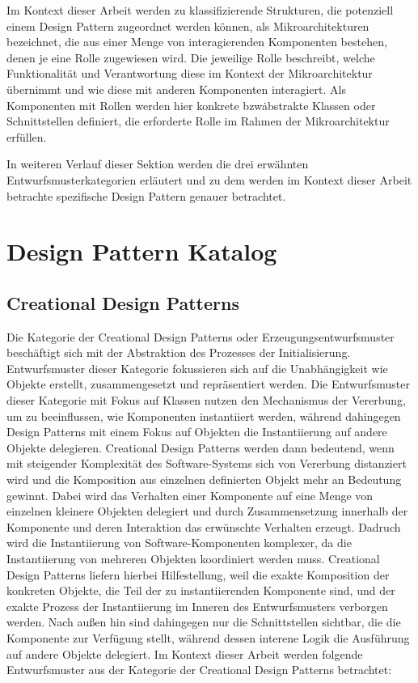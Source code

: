 Im Kontext dieser Arbeit werden zu klassifizierende Strukturen, die potenziell einem Design Pattern zugeordnet werden können, als Mikroarchitekturen bezeichnet, die aus einer Menge von interagierenden Komponenten bestehen, denen je eine Rolle zugewiesen wird. Die jeweilige Rolle beschreibt, welche Funktionalität und Verantwortung diese im Kontext der Mikroarchitektur übernimmt und wie diese mit anderen Komponenten interagiert.
Als Komponenten mit Rollen werden hier konkrete bzw\. abstrakte Klassen oder Schnittstellen definiert, die erforderte Rolle im Rahmen der Mikroarchitektur erfüllen.

In weiteren Verlauf dieser Sektion werden die drei erwähnten Entwurfsmusterkategorien erläutert und zu dem werden im Kontext dieser Arbeit betrachte spezifische Design Pattern genauer betrachtet.

\newpage

\section{Design Pattern Katalog}

\subsection{Creational Design Patterns}

Die Kategorie der Creational Design Patterns oder Erzeugungsentwurfsmuster beschäftigt sich mit der Abstraktion des Prozesses der Initialisierung\cite[S. 81]{gamma1994design}. Entwurfsmuster dieser Kategorie fokussieren sich auf die Unabhängigkeit wie Objekte erstellt, zusammengesetzt und repräsentiert werden.
Die Entwurfsmuster dieser Kategorie mit Fokus auf Klassen nutzen den Mechanismus der Vererbung, um zu beeinflussen, wie Komponenten instantiiert werden, während dahingegen Design Patterns mit einem Fokus auf Objekten die Instantiierung auf andere Objekte delegieren.
Creational Design Patterns werden dann bedeutend, wenn mit steigender Komplexität des Software-Systems sich von Vererbung distanziert wird und die Komposition aus einzelnen definierten Objekt mehr an Bedeutung gewinnt\cite[S. 81]{gamma1994design}. Dabei wird das Verhalten einer Komponente auf eine Menge von einzelnen kleinere Objekten delegiert und durch Zusammensetzung innerhalb der Komponente und deren Interaktion das erwünschte Verhalten erzeugt.
Dadruch wird die Instantiierung von Software-Komponenten komplexer, da die Instantiierung von mehreren Objekten koordiniert werden muss. Creational Design Patterns liefern hierbei Hilfestellung, weil die exakte Komposition der konkreten Objekte, die Teil der zu instantiierenden Komponente sind, und der exakte Prozess der Instantiierung im Inneren des Entwurfsmusters verborgen werden. Nach außen hin sind dahingegen nur die Schnittstellen sichtbar, die die Komponente zur Verfügung stellt, während dessen interene Logik die Ausführung auf andere Objekte delegiert.
Im Kontext dieser Arbeit werden folgende Entwurfsmuster aus der Kategorie der Creational Design Patterns betrachtet:


